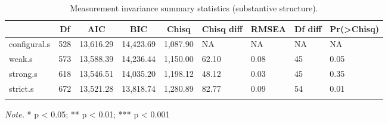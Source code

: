 \documentclass[
  man]{apa6}
\begin{document}
\begin{table}[tbp]

\begin{center}
\begin{threeparttable}

\caption{\label{tab:measinv.pilot.sub}Measurement invariance summary statistics (substantive structure).}

\begin{tabular}{lllllllll}
\toprule
 & \multicolumn{1}{c}{Df} & \multicolumn{1}{c}{AIC} & \multicolumn{1}{c}{BIC} & \multicolumn{1}{c}{Chisq} & \multicolumn{1}{c}{Chisq diff} & \multicolumn{1}{c}{RMSEA} & \multicolumn{1}{c}{Df diff} & \multicolumn{1}{c}{Pr(>Chisq)}\\
\midrule
configural.s & 528 & 13,616.29 & 14,423.69 & 1,087.90 & NA & NA & NA & NA\\
weak.s & 573 & 13,588.39 & 14,236.44 & 1,150.00 & 62.10 & 0.08 & 45 & 0.05\\
strong.s & 618 & 13,546.51 & 14,035.20 & 1,198.12 & 48.12 & 0.03 & 45 & 0.35\\
strict.s & 672 & 13,521.28 & 13,818.74 & 1,280.89 & 82.77 & 0.09 & 54 & 0.01\\
\bottomrule
\addlinespace
\end{tabular}

\begin{tablenotes}[para]
\normalsize{\textit{Note.} * p < 0.05; ** p < 0.01; *** p < 0.001}
\end{tablenotes}

\end{threeparttable}
\end{center}

\end{table}
\end{document}
